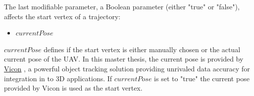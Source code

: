 The last modifiable parameter, a Boolean parameter (either "true" or "false"), affects the start vertex of a trajectory:

\begin{itemize}
  \item $currentPose$
\end{itemize}


$currentPose$ defines if the start vertex is either manually chosen or the actual current pose of the UAV. In this master thesis, the current pose is provided by \href{http://www.vicon.com/}{Vicon} \cite{Vicon}, a powerful object tracking solution providing unrivaled data accuracy for integration in to 3D applications. If $currentPose$ is set to "true" the current pose provided by Vicon is used as the start vertex.








%
%
%
%
%
%
%
%
%

